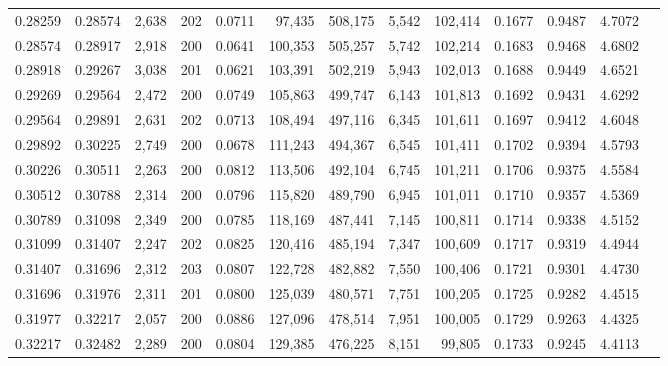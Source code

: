 \begin{tabular}{rrrrrrrrrrrrr}
0.28259 & 0.28574 & 2,638 & 202 &                                     0.0711 &  97,435 & 508,175 &   5,542 & 102,414 & 0.1677 & 0.9487 & 4.7072 \\
0.28574 & 0.28917 & 2,918 & 200 &                                     0.0641 & 100,353 & 505,257 &   5,742 & 102,214 & 0.1683 & 0.9468 & 4.6802 \\
0.28918 & 0.29267 & 3,038 & 201 &                                     0.0621 & 103,391 & 502,219 &   5,943 & 102,013 & 0.1688 & 0.9449 & 4.6521 \\
0.29269 & 0.29564 & 2,472 & 200 &                                     0.0749 & 105,863 & 499,747 &   6,143 & 101,813 & 0.1692 & 0.9431 & 4.6292 \\
0.29564 & 0.29891 & 2,631 & 202 &                                     0.0713 & 108,494 & 497,116 &   6,345 & 101,611 & 0.1697 & 0.9412 & 4.6048 \\
0.29892 & 0.30225 & 2,749 & 200 &                                     0.0678 & 111,243 & 494,367 &   6,545 & 101,411 & 0.1702 & 0.9394 & 4.5793 \\
0.30226 & 0.30511 & 2,263 & 200 &                                     0.0812 & 113,506 & 492,104 &   6,745 & 101,211 & 0.1706 & 0.9375 & 4.5584 \\
0.30512 & 0.30788 & 2,314 & 200 &                                     0.0796 & 115,820 & 489,790 &   6,945 & 101,011 & 0.1710 & 0.9357 & 4.5369 \\
0.30789 & 0.31098 & 2,349 & 200 &                                     0.0785 & 118,169 & 487,441 &   7,145 & 100,811 & 0.1714 & 0.9338 & 4.5152 \\
0.31099 & 0.31407 & 2,247 & 202 &                                     0.0825 & 120,416 & 485,194 &   7,347 & 100,609 & 0.1717 & 0.9319 & 4.4944 \\
0.31407 & 0.31696 & 2,312 & 203 &                                     0.0807 & 122,728 & 482,882 &   7,550 & 100,406 & 0.1721 & 0.9301 & 4.4730 \\
0.31696 & 0.31976 & 2,311 & 201 &                                     0.0800 & 125,039 & 480,571 &   7,751 & 100,205 & 0.1725 & 0.9282 & 4.4515 \\
0.31977 & 0.32217 & 2,057 & 200 &                                     0.0886 & 127,096 & 478,514 &   7,951 & 100,005 & 0.1729 & 0.9263 & 4.4325 \\
0.32217 & 0.32482 & 2,289 & 200 &                                     0.0804 & 129,385 & 476,225 &   8,151 &  99,805 & 0.1733 & 0.9245 & 4.4113 \\

\end{tabular}
